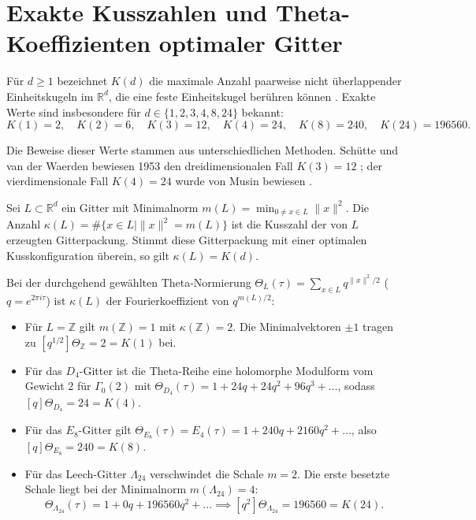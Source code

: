 \documentclass[11pt,a4paper]{article}
\begin{document}
	\section{Exakte Kusszahlen und Theta-Koeffizienten optimaler Gitter}
	
	Für $d \ge 1$ bezeichnet $K(d)$ die maximale Anzahl paarweise nicht überlappender Einheitskugeln im $\mathbb{R}^d$, die eine feste Einheitskugel berühren können \cite{conway}. Exakte Werte sind insbesondere für $d \in \{1, 2, 3, 4, 8, 24\}$ bekannt:
	\begin{equation}
		K(1)=2, \quad K(2)=6, \quad K(3)=12, \quad K(4)=24, \quad K(8)=240, \quad K(24)=196560.
	\end{equation}
	
	Die Beweise dieser Werte stammen aus unterschiedlichen Methoden. Schütte und van der Waerden bewiesen 1953 den dreidimensionalen Fall $K(3)=12$ \cite{schuette}; der vierdimensionale Fall $K(4)=24$ wurde von Musin bewiesen \cite{musin}.
	
	Sei $L \subset \mathbb{R}^d$ ein Gitter mit Minimalnorm $m(L) = \min_{0 \neq x \in L} \|x\|^2$. Die Anzahl $\kappa(L) = \#\{x \in L \mid \|x\|^2 = m(L)\}$ ist die Kusszahl der von $L$ erzeugten Gitterpackung. Stimmt diese Gitterpackung mit einer optimalen Kusskonfiguration überein, so gilt $\kappa(L) = K(d)$.
	
	Bei der durchgehend gewählten Theta-Normierung $\Theta_L(\tau) = \sum_{x \in L} q^{\|x\|^2/2}$ ($q = e^{2\pi i \tau}$) ist $\kappa(L)$ der Fourierkoeffizient von $q^{m(L)/2}$:
	\begin{itemize}
		\item Für $L = \mathbb{Z}$ gilt $m(\mathbb{Z})=1$ mit $\kappa(\mathbb{Z})=2$. Die Minimalvektoren $\pm 1$ tragen zu $[q^{1/2}]\Theta_{\mathbb{Z}} = 2 = K(1)$ bei.
		\item Für das $D_4$-Gitter ist die Theta-Reihe eine holomorphe Modulform vom Gewicht 2 für $\Gamma_0(2)$ mit $\Theta_{D_4}(\tau) = 1 + 24q + 24q^2 + 96q^3 + \dots$, sodass $[q]\Theta_{D_4} = 24 = K(4)$.
		\item Für das $E_8$-Gitter gilt $\Theta_{E_8}(\tau) = E_4(\tau) = 1 + 240q + 2160q^2 + \dots$, also $[q]\Theta_{E_8} = 240 = K(8)$.
		\item Für das Leech-Gitter $\Lambda_{24}$ verschwindet die Schale $m=2$. Die erste besetzte Schale liegt bei der Minimalnorm $m(\Lambda_{24})=4$:
		\begin{equation}
			\Theta_{\Lambda_{24}}(\tau) = 1 + 0q + 196560 q^2 + \dots \implies [q^2]\Theta_{\Lambda_{24}} = 196560 = K(24).
		\end{equation}
	\end{itemize}
	
\end{document}
